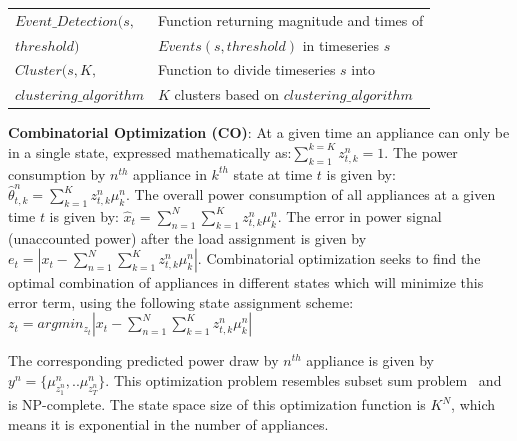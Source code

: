 \documentclass[conference]{IEEEtran}
\begin{document}
\begin{table}[ht!]
\begin{tabular}{|l|l|}
\hline
$Event\_Detection(s,$ & Function returning magnitude and times of \\
$threshold)$                  &$Events(s,threshold)$ in timeseries $s$\\
\hline
$Cluster(s,K,$& Function to divide timeseries $s$ into\\
$clustering\_algorithm$&$K$ clusters based on $clustering\_algorithm$ \\
\hline

                             
                                                                               

\hline
%
\end{tabular}
\vspace{-8pt}
\end{table}

\noindent \textbf{Combinatorial Optimization (CO)}: At a given time an appliance can only be in a single state, expressed mathematically as:$\sum\limits_{k=1}^{k=K} z_{t,k}^n=1$. The power consumption by $n^{th}$ appliance in $k^{th}$ state at time $t$ is given by: $\hat{\theta}^n_{t,k}=\sum\limits_{k=1}^{K} z_{t,k}^n \mu_k^n$. The overall power consumption of all appliances at a given time $t$ is given by: $\hat{x}_{t}=\sum\limits_{n=1}^{N}\sum\limits_{k=1}^{K} z_{t,k}^n \mu_k^n$. The error in power signal (unaccounted power) after the load assignment is given by $e_t=|x_t-\sum\limits_{n=1}^{N}\sum\limits_{k=1}^{K}z_{t,k}^n\mu_k^n|$. Combinatorial optimization seeks to find the optimal combination of appliances in different states which will minimize this error term, using the following state assignment scheme:
\vspace{-1mm}
$z_t=arg min_{z_t}|x_t-\sum\limits_{n=1}^{N}\sum\limits_{k=1}^{K}z_{t,k}^n\mu_k^n|$
\vspace{-1mm}

\noindent The corresponding predicted power draw by $n^{th}$ appliance is given by $y^n=\{\mu_{z_1^n}^n,..\mu_{z_T^n}^n \}$. This optimization problem resembles subset sum problem~\cite{knapsack} and is NP-complete. The state space size of this optimization function is $K^N$, which means it is exponential in the number of appliances. 
\end{document}
